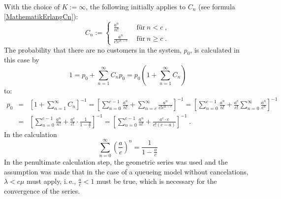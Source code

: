 \documentclass[a4paper,11pt,oneside]{article}
\theoremstyle{definition}
\begin{document}
With the choice of $K:=\infty$, the following initially applies to $C_n$ (see formula \eqref{MathematikErlangCn}):
\begin{equation*}
C_n:=\left\{\begin{array}{ll}
\displaystyle \frac{a^n}{n!}&~~\textrm{für}~n<c\;,\\
\displaystyle \frac{a^n}{c!c^{n-c}}&~~\textrm{für}~n\ge c\;.
\end{array}\right.
\end{equation*}
The probability that there are no customers in the system, $p_0$, is calculated in this case by
$$
1=
p_0+\sum_{n=1}^\infty C_np_0=
p_0\left(1+\sum_{n=1}^\infty C_n\right)
$$
to:
\begin{eqnarray*}
p_0&=&
\left[1+\sum_{n=1}^\infty C_n\right]^{-1}=
\left[\sum_{n=0}^{c-1}\frac{a^n}{n!}+\sum_{n=c}^\infty\frac{a^n}{c!c^{n-c}}\right]^{-1}=
\left[\sum_{n=0}^{c-1}\frac{a^n}{n!}+\frac{a^c}{c!}\sum_{n=0}^\infty\frac{a^n}{c^n}\right]^{-1}\\&=&
\left[\sum_{n=0}^{c-1}\frac{a^n}{n!}+\frac{a^c}{c!}\cdot\frac{1}{1-\frac{a}{c}}\right]^{-1}=
\left[\sum_{n=0}^{c-1}\frac{a^n}{n!}+\frac{a^c\cdot c}{c!(c-a)}\right]^{-1}\;.
\end{eqnarray*}
In the calculation
$$
\sum_{n=0}^\infty\left(\frac{a}{c}\right)^n=\frac{1}{1-\frac{a}{c}}
$$
In the penultimate calculation step, the geometric series was used and the assumption was made that in the case of a queueing model without cancelations, $\lambda<c\mu$ must apply, i.\,e., $\frac{a}{c}<1$ must be true, which is necessary for the convergence of the series.
\end{document}
